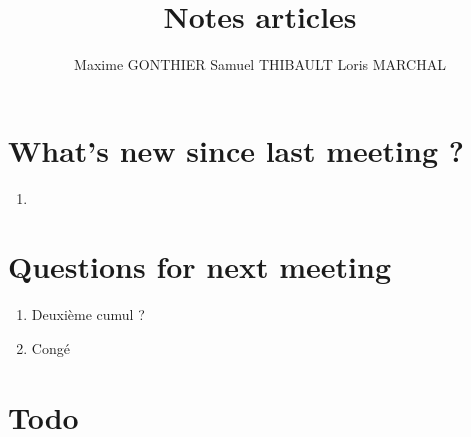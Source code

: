 \documentclass[a4paper]{article}
\title{Notes articles}
\author{Maxime GONTHIER Samuel THIBAULT Loris MARCHAL}
\begin{document}
\newpage


\section{What's new since last meeting ?}

	\begin{enumerate}
		\item
	\end{enumerate}
	
\section{Questions for next meeting}

	\begin{enumerate}
		\item Deuxième cumul ?
		\item Congé
	\end{enumerate}

\section{Todo}
\end{document}
